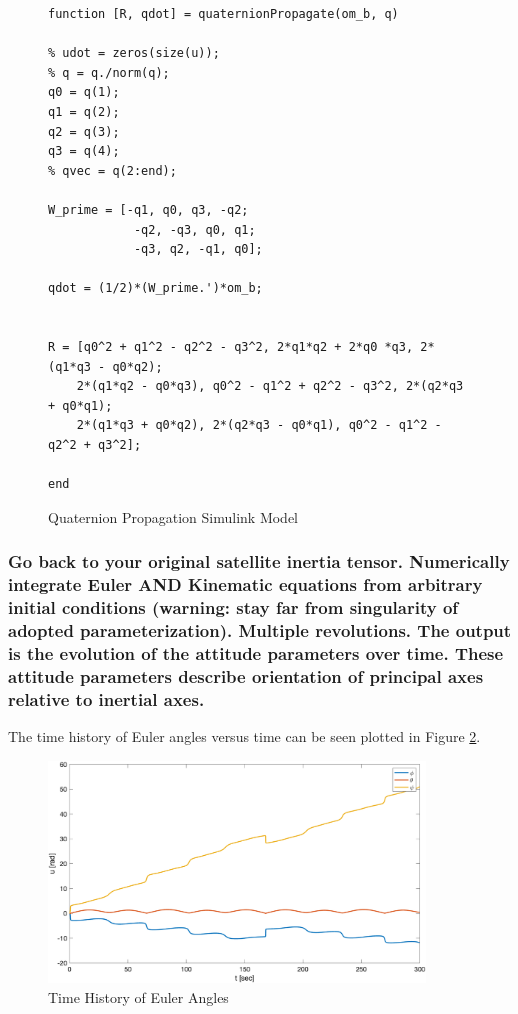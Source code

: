 \begin{figure} [H]
    \centering
    \begin{lstlisting}
function [R, qdot] = quaternionPropagate(om_b, q)

% udot = zeros(size(u));
% q = q./norm(q);
q0 = q(1);
q1 = q(2);
q2 = q(3);
q3 = q(4);
% qvec = q(2:end);

W_prime = [-q1, q0, q3, -q2;
            -q2, -q3, q0, q1;
            -q3, q2, -q1, q0];

qdot = (1/2)*(W_prime.')*om_b;


R = [q0^2 + q1^2 - q2^2 - q3^2, 2*q1*q2 + 2*q0 *q3, 2*(q1*q3 - q0*q2);
    2*(q1*q2 - q0*q3), q0^2 - q1^2 + q2^2 - q3^2, 2*(q2*q3 + q0*q1);
    2*(q1*q3 + q0*q2), 2*(q2*q3 - q0*q1), q0^2 - q1^2 - q2^2 + q3^2];

end
    \end{lstlisting}
    \caption{Quaternion Propagation Simulink Model}
    \label{fig:quat_prop_model}
\end{figure}

\subsubsection{Go back to your original satellite inertia tensor. Numerically integrate Euler AND Kinematic equations from arbitrary initial conditions (warning: stay far from singularity of adopted parameterization). Multiple revolutions. The output is the evolution of the attitude parameters over time. These attitude parameters describe orientation of principal axes relative to inertial axes.}

The time history of Euler angles versus time can be seen plotted in  Figure \ref{fig:time_history_EA}.

\begin{figure} [H]
    \centering
    \captionsetup{justification = centering}
    \includegraphics[width = 10cm] {Images/time_history_EA.png}
    \caption{Time History of Euler Angles}
    \label{fig:time_history_EA}
\end{figure}

